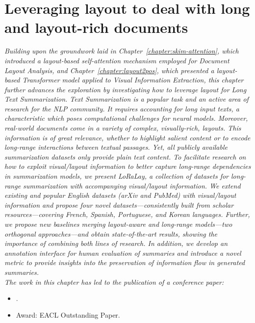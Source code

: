 
\chapter{Leveraging layout to deal with long and layout-rich documents}
\label{chapter:loralay}

\renewcommand{\leftmark}{\spacedlowsmallcaps{Leveraging layout to deal with long and layout-rich documents}}

\begin{chapabstract}
    {\em
    Building upon the groundwork laid in Chapter~\ref{chapter:skim-attention}, which introduced a layout-based self-attention mechanism employed for Document Layout Analysis, and Chapter~\ref{chapter:layout2pos}, which presented a layout-based Transformer model applied to Visual Information Extraction, this chapter further advances the exploration by investigating how to leverage layout for Long Text Summarization.
    Text Summarization is a popular task and an active area of research for the \ac{NLP} community. It requires accounting for long input texts, a characteristic which poses computational challenges for neural models. 
    Moreover, real-world documents come in a variety of complex, visually-rich, layouts. This information is of great relevance, whether to highlight salient content or to encode long-range interactions between textual passages. Yet, all publicly available summarization datasets only provide plain text content.
    To facilitate research on how to exploit visual/layout information to better capture long-range dependencies in summarization models, we present \textit{LoRaLay}, a collection of datasets for long-range summarization with accompanying visual/layout information. We extend existing and popular English datasets (arXiv and PubMed) with visual/layout information and propose four novel datasets—consistently built from scholar resources—covering French, Spanish, Portuguese, and Korean languages.
    Further, we propose new baselines merging layout-aware and long-range models—two orthogonal approaches—and obtain state-of-the-art results, showing the importance of combining both lines of research. In addition, we develop an annotation interface for human evaluation of summaries and introduce a novel metric to provide insights into the preservation of information flow in generated summaries. \\
    \vspace*{5mm}
    The work in this chapter has led to the publication of a conference paper:}
    \begin{itemize}
        \item \small {}.
        \item \small Award: EACL Outstanding Paper.
    \end{itemize}
\end{chapabstract}

